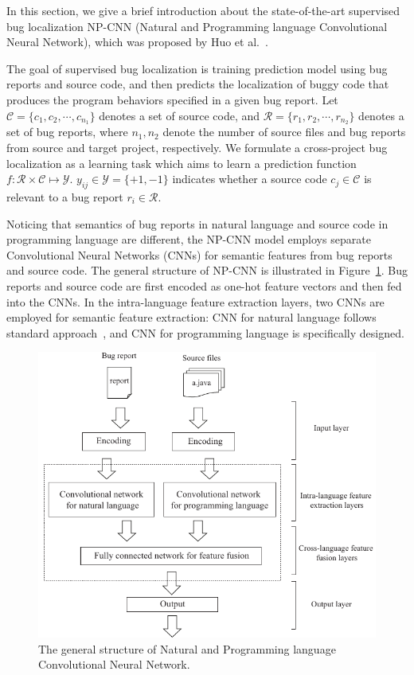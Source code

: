 In this section, we give a brief introduction about the state-of-the-art supervised bug localization NP-CNN (Natural and Programming language Convolutional Neural Network), which was proposed by Huo et al.~\cite{huo2016learning}. %

The goal of supervised bug localization is training prediction model using bug reports and source code,  and then predicts the localization of buggy code that produces the program behaviors specified in a given bug report. Let $\mathcal{C} =\{ c_1, c_2, \cdots, c_{n_1} \}$ denotes a set of source code, and $\mathcal{R} =\{ r_1, r_2, \cdots, r_{n_2}\} $ denotes a set of bug reports, where $n_1, n_2$ denote the number of source files and bug reports from source and target project, respectively. We formulate a cross-project bug localization as a learning task which aims to learn a prediction function $f: \mathcal{R} \times \mathcal{C} \mapsto \mathcal{Y}$. $y_{ij} \in \mathcal{Y} = \{+1, -1 \}$ indicates whether a source code $c_j \in \mathcal{C} $ is relevant to a bug report $r_i \in \mathcal{R}$.

Noticing that semantics of bug reports in natural language and source code in programming language are different, the NP-CNN model employs separate Convolutional Neural Networks (CNNs) for semantic features from bug reports and source code. The general structure of NP-CNN is illustrated in Figure~\ref{fig:npcnn-structure}. Bug reports and source code are first encoded as one-hot feature vectors and then fed into the CNNs. In the intra-language feature extraction layers, two CNNs are employed for semantic feature extraction: CNN for natural language follows standard approach~\cite{kim2014convolutional}, and CNN for programming language is specifically designed. 

\begin{figure}[hbt]
\centering
\includegraphics[width = \columnwidth]{pic/NPCNN-structure.pdf}
\caption{The general structure of Natural and Programming language Convolutional Neural Network.}
\label{fig:npcnn-structure}
\end{figure}

